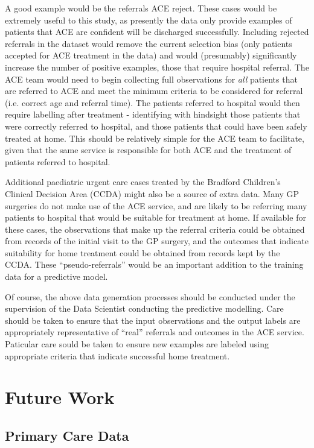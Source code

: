 A good example would be the referrals ACE reject. These cases would be extremely useful to this study, as presently the data only provide examples of patients that ACE are confident will be discharged successfully. Including rejected referrals in the dataset would remove the current selection bias (only patients accepted for ACE treatment in the data) and would (presumably) significantly increase the number of positive examples, those that require hospital referral. The ACE team would need to begin collecting full observations for \textit{all} patients that are referred to ACE and meet the minimum criteria to be considered for referral (i.e. correct age and referral time). The patients referred to hospital would then require labelling after treatment - identifying with hindsight those patients that were correctly referred to hospital, and those patients that could have been safely treated at home. This should be relatively simple for the ACE team to facilitate, given that the same service is responsible for both ACE and the treatment of patients referred to hospital.

Additional paediatric urgent care cases treated by the Bradford Children's Clinical Decision Area (CCDA) might also be a source of extra data. Many GP surgeries do not make use of the ACE service, and are likely to be referring many patients to hospital that would be suitable for treatment at home. If available for these cases, the observations that make up the referral criteria could be obtained from records of the initial visit to the GP surgery, and the outcomes that indicate suitability for home treatment could be obtained from records kept by the CCDA. These ``pseudo-referrals'' would be an important addition to the training data for a predictive model.

Of course, the above data generation processes should be conducted under the supervision of the Data Scientist conducting the predictive modelling. Care should be taken to ensure that the input observations and the output labels are appropriately representative of ``real'' referrals and outcomes in the ACE service. Paticular care sould be taken to ensure new examples are labeled using appropriate criteria that indicate successful home treatment.

\section{Future Work}

\subsection{Primary Care Data}

